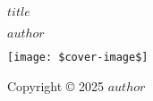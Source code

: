 \begin{titlepage}
\centering
\vspace*{2cm}
{\Huge\bfseries $title$\par}
\vspace{2cm}
{\Large\itshape $author$\par}
\vfill
\texttt{[image: \$cover-image\$]}
\vfill
\end{titlepage}

\clearpage
\thispagestyle{empty}
\null
\vfill
\begin{flushleft}
Copyright © 2025 $author$
\end{flushleft}
\clearpage
